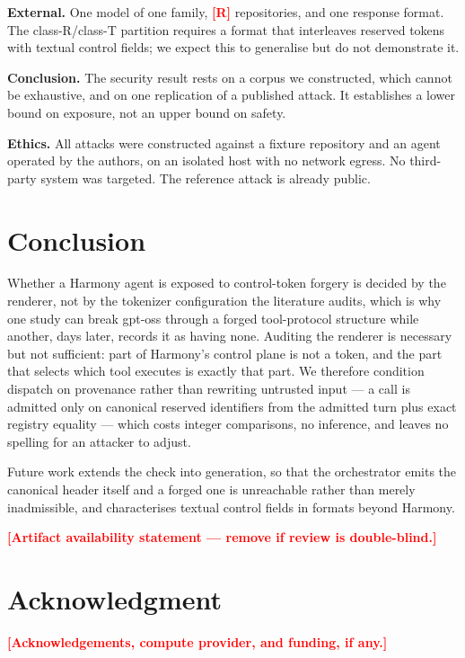 \documentclass[conference]{IEEEtran}
\newcommand{\PH}[1]{\textcolor{red}{\textbf{[#1]}}}
\begin{document}
\textbf{External.} One model of one family, \PH{R} repositories, and one
response format. The class-R/class-T partition requires a format that
interleaves reserved tokens with textual control fields; we expect this to
generalise but do not demonstrate it.

\textbf{Conclusion.} The security result rests on a corpus we constructed, which
cannot be exhaustive, and on one replication of a published attack. It
establishes a lower bound on exposure, not an upper bound on safety.

\textbf{Ethics.} All attacks were constructed against a fixture repository and an
agent operated by the authors, on an isolated host with no network egress. No
third-party system was targeted. The reference attack is already public.

\section{Conclusion}
\label{sec:conclusion}

Whether a Harmony agent is exposed to control-token forgery is decided by the
renderer, not by the tokenizer configuration the literature audits, which is why
one study can break gpt-oss through a forged tool-protocol structure while
another, days later, records it as having none. Auditing the renderer is
necessary but not sufficient: part of Harmony's control plane is not a token, and
the part that selects which tool executes is exactly that part. We therefore
condition dispatch on provenance rather than rewriting untrusted input --- a call
is admitted only on canonical reserved identifiers from the admitted turn plus
exact registry equality --- which costs integer comparisons, no inference, and
leaves no spelling for an attacker to adjust.

Future work extends the check into generation, so that the orchestrator emits
the canonical header itself and a forged one is unreachable rather than merely
inadmissible, and characterises textual control fields in formats beyond
Harmony.

\PH{Artifact availability statement --- remove if review is double-blind.}

\section*{Acknowledgment}

\PH{Acknowledgements, compute provider, and funding, if any.}



\end{document}
